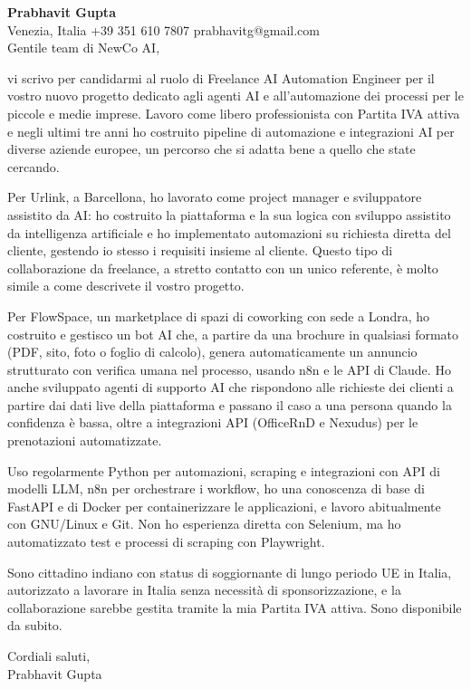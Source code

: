 \documentclass[a4paper,10.5pt]{article}
\begin{document}
\textbf{Prabhavit Gupta}\\
Venezia, Italia \textbar{} +39 351 610 7807 \textbar{} prabhavitg@gmail.com\\[10pt]
Gentile team di NewCo AI,

vi scrivo per candidarmi al ruolo di Freelance AI Automation Engineer per il vostro nuovo progetto dedicato agli agenti AI e all'automazione dei processi per le piccole e medie imprese. Lavoro come libero professionista con Partita IVA attiva e negli ultimi tre anni ho costruito pipeline di automazione e integrazioni AI per diverse aziende europee, un percorso che si adatta bene a quello che state cercando.

Per Urlink, a Barcellona, ho lavorato come project manager e sviluppatore assistito da AI: ho costruito la piattaforma e la sua logica con sviluppo assistito da intelligenza artificiale e ho implementato automazioni su richiesta diretta del cliente, gestendo io stesso i requisiti insieme al cliente. Questo tipo di collaborazione da freelance, a stretto contatto con un unico referente, è molto simile a come descrivete il vostro progetto.

Per FlowSpace, un marketplace di spazi di coworking con sede a Londra, ho costruito e gestisco un bot AI che, a partire da una brochure in qualsiasi formato (PDF, sito, foto o foglio di calcolo), genera automaticamente un annuncio strutturato con verifica umana nel processo, usando n8n e le API di Claude. Ho anche sviluppato agenti di supporto AI che rispondono alle richieste dei clienti a partire dai dati live della piattaforma e passano il caso a una persona quando la confidenza è bassa, oltre a integrazioni API (OfficeRnD e Nexudus) per le prenotazioni automatizzate.

Uso regolarmente Python per automazioni, scraping e integrazioni con API di modelli LLM, n8n per orchestrare i workflow, ho una conoscenza di base di FastAPI e di Docker per containerizzare le applicazioni, e lavoro abitualmente con GNU/Linux e Git. Non ho esperienza diretta con Selenium, ma ho automatizzato test e processi di scraping con Playwright.

Sono cittadino indiano con status di soggiornante di lungo periodo UE in Italia, autorizzato a lavorare in Italia senza necessità di sponsorizzazione, e la collaborazione sarebbe gestita tramite la mia Partita IVA attiva. Sono disponibile da subito.

Cordiali saluti,\\
Prabhavit Gupta
\end{document}
